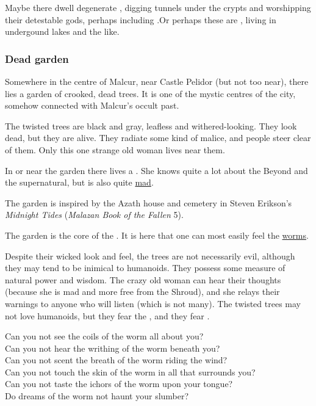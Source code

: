 Maybe there dwell degenerate \troglodytes, digging tunnels under the crypts and worshipping their detestable gods, perhaps including \dragons.Or perhaps these are \nagae, living in undergound lakes and the like.





\subsubsection{Dead garden}
\label{Dead garden in Malcur}
\label{dead garden}
Somewhere in the centre of Malcur, near Castle Pelidor (but not too near), there lies a garden of crooked, dead trees. It is one of the mystic centres of the city, somehow connected with Malcur's occult past. 

The twisted trees are black and gray, leafless and withered-looking. They look dead, but they are alive. They radiate some kind of malice, and people steer clear of them. Only this one strange old woman lives near them. 

In or near the garden there lives a . She knows quite a lot about the Beyond and the supernatural, but is also quite \hyperref[Madness]{mad}.

The garden is inspired by the Azath house and cemetery in Steven Erikson's \emph{Midnight Tides} (\emph{Malazan Book of the Fallen} 5). 

The garden is the core of the \nexus. It is here that one can most easily feel the \hyperref[Zeirath's creatures]{worms}. 

Despite their wicked look and feel, the trees are not necessarily evil, although they may tend to be inimical to humanoids. They possess some measure of natural power and wisdom. The crazy old woman can hear their thoughts (because she is mad and more free from the Shroud), and she relays their warnings to anyone who will listen (which is not many). The twisted trees may not love humanoids, but they fear the \ghobaleth{}, and they fear \Nithdornazsh.

{Can you not see the coils of the worm all about you?\\
Can you not hear the writhing of the worm beneath you?\\
Can you not scent the breath of the worm riding the wind?\\
Can you not touch the skin of the worm in all that surrounds you?\\
Can you not taste the ichors of the worm upon your tongue?\\
Do dreams of the worm not haunt your slumber?}





